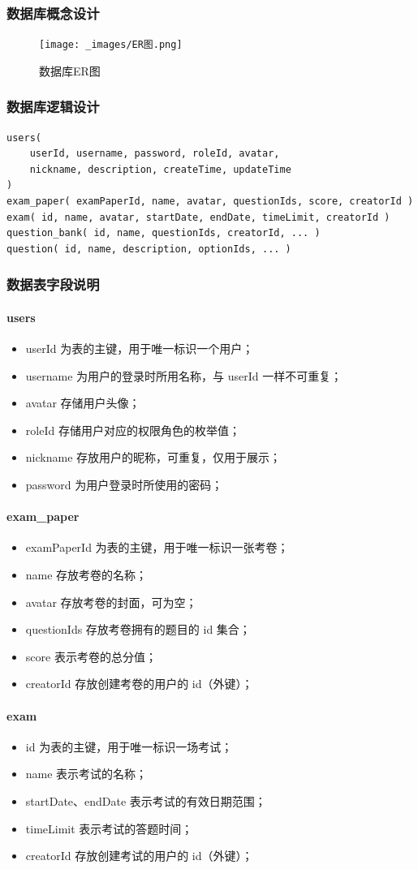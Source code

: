 \subsubsection{数据库概念设计}
\begin{figure}[htb]
    \centering
    \texttt{[image: \_images/ER图.png]}
    \caption{数据库ER图}
\end{figure}

\subsubsection{数据库逻辑设计}
\begin{lstlisting}
users(
    userId, username, password, roleId, avatar,
    nickname, description, createTime, updateTime
)
exam_paper( examPaperId, name, avatar, questionIds, score, creatorId )
exam( id, name, avatar, startDate, endDate, timeLimit, creatorId )
question_bank( id, name, questionIds, creatorId, ... )
question( id, name, description, optionIds, ... )
\end{lstlisting}
\subsubsection{数据表字段说明}
\paragraph{users}
\begin{itemize}
    \item userId 为表的主键，用于唯一标识一个用户；
    \item username 为用户的登录时所用名称，与 userId 一样不可重复；
    \item avatar 存储用户头像；
    \item roleId 存储用户对应的权限角色的枚举值；
    \item nickname 存放用户的昵称，可重复，仅用于展示；
    \item password 为用户登录时所使用的密码；
\end{itemize}
\paragraph{exam\_paper}
\begin{itemize}
    \item examPaperId 为表的主键，用于唯一标识一张考卷；
    \item name 存放考卷的名称；
    \item avatar 存放考卷的封面，可为空；
    \item questionIds 存放考卷拥有的题目的 id 集合；
    \item score 表示考卷的总分值；
    \item creatorId 存放创建考卷的用户的 id（外键）；
\end{itemize}
\paragraph{exam}
\begin{itemize}
    \item id 为表的主键，用于唯一标识一场考试；
    \item name 表示考试的名称；
    \item startDate、endDate 表示考试的有效日期范围；
    \item timeLimit 表示考试的答题时间；
    \item creatorId 存放创建考试的用户的 id（外键）；
\end{itemize}